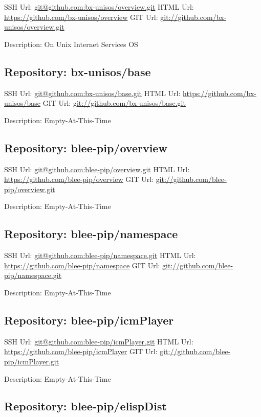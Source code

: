 SSH Url:  \url{git@github.com:bx-unisos/overview.git}
HTML Url: \url{https://github.com/bx-unisos/overview}
GIT Url:  \url{git://github.com/bx-unisos/overview.git}

Description: On Unix Internet Services OS

\subsection{Repository: bx-unisos/base}

SSH Url:  \url{git@github.com:bx-unisos/base.git}
HTML Url: \url{https://github.com/bx-unisos/base}
GIT Url:  \url{git://github.com/bx-unisos/base.git}

Description: Empty-At-This-Time

\subsection{Repository: blee-pip/overview}

SSH Url:  \url{git@github.com:blee-pip/overview.git}
HTML Url: \url{https://github.com/blee-pip/overview}
GIT Url:  \url{git://github.com/blee-pip/overview.git}

Description: Empty-At-This-Time

\subsection{Repository: blee-pip/namespace}

SSH Url:  \url{git@github.com:blee-pip/namespace.git}
HTML Url: \url{https://github.com/blee-pip/namespace}
GIT Url:  \url{git://github.com/blee-pip/namespace.git}

Description: Empty-At-This-Time

\subsection{Repository: blee-pip/icmPlayer}

SSH Url:  \url{git@github.com:blee-pip/icmPlayer.git}
HTML Url: \url{https://github.com/blee-pip/icmPlayer}
GIT Url:  \url{git://github.com/blee-pip/icmPlayer.git}

Description: Empty-At-This-Time

\subsection{Repository: blee-pip/elispDist}

